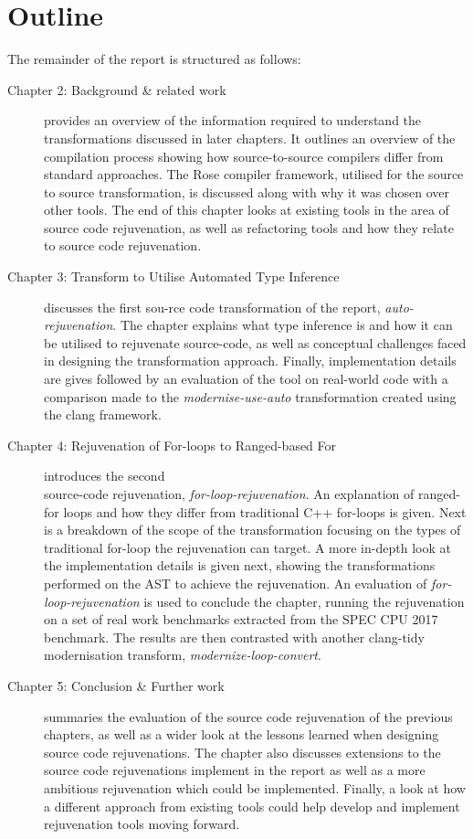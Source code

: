 \documentclass[bsc,frontabs,singlespacing,twoside,parskip,deptreport]{infthesis}
\begin{document}
\section{Outline}
The remainder of the report is structured as follows:
\begin{description}
    \item [Chapter 2: Background \& related work] provides an overview of the information required to understand the transformations discussed in later chapters. It outlines an overview of the compilation process showing how source-to-source compilers differ from standard approaches. The Rose compiler framework, utilised for the source to source transformation, is discussed along with why it was chosen over other tools. The end of this chapter looks at existing tools in the area of source code rejuvenation, as well as refactoring tools and how they relate to source code rejuvenation.
    
    \item [Chapter 3: Transform to Utilise Automated Type Inference] discusses the first sou-rce code transformation of the report, \textit{auto-rejuvenation}. The chapter explains what type inference is and how it can be utilised to rejuvenate source-code, as well as conceptual challenges faced in designing the transformation approach. Finally, implementation details are gives followed by an evaluation of the tool on real-world code with a comparison made to the \textit{modernise-use-auto} transformation created using the clang framework. 
    
    \item [Chapter 4: Rejuvenation of For-loops to Ranged-based For] introduces the second\\ source-code rejuvenation, \textit{for-loop-rejuvenation}. An explanation of ranged-for loops and how they differ from traditional C++ for-loops is given. Next is a breakdown of the scope of the transformation focusing on the types of traditional for-loop the rejuvenation can target. A more in-depth look at the implementation details is given next, showing the transformations performed on the AST to achieve the rejuvenation. An evaluation of \textit{for-loop-rejuvenation} is used to conclude the chapter, running the rejuvenation on a set of real work benchmarks extracted from the SPEC CPU 2017 benchmark. The results are then contrasted with another clang-tidy modernisation transform, \textit{modernize-loop-convert}. 
    
    \item [Chapter 5: Conclusion \& Further work] summaries the evaluation of the source code rejuvenation of the previous chapters, as well as a wider look at the lessons learned when designing source code rejuvenations. The chapter also discusses extensions to the source code rejuvenations implement in the report as well as a more ambitious rejuvenation which could be implemented. Finally, a look at how a different approach from existing tools could help develop and implement rejuvenation tools moving forward.
    
\end{description}
 
\end{document}
